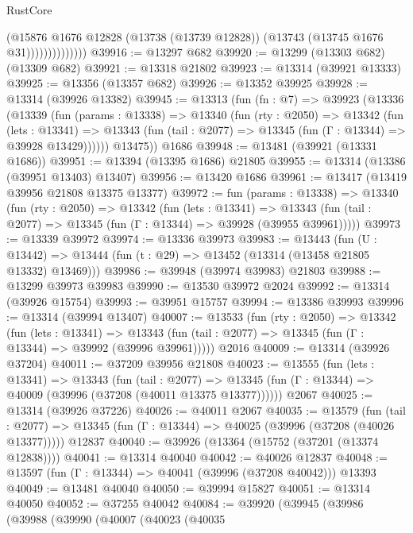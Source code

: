 \begin{lexlean}{RustCore}
\begin{coremodule}
                          (@15876
                            @1676
                            @12828
                            (@13738 (@13739 @12828))
                            (@13743 (@13745 @1676 @31))))))))))))))
@39916 := @13297 @682
@39920 := @13299 (@13303 @682) (@13309 @682)
@39921 := @13318 @21802
@39923 := @13314 (@39921 @13333)
@39925 := @13356 (@13357 @682)
@39926 := @13352 @39925
@39928 := @13314 (@39926 @13382)
@39945 := @13313
    (fun (fn : @7) =>
    @39923
      (@13336
        (@13339
          (fun (params : @13338) =>
          @13340
            (fun (rty : @2050) =>
            @13342
              (fun (lets : @13341) =>
              @13343 (fun (tail : @2077) => @13345 (fun (Γ : @13344) => @39928 @13429))))))
        @13475))
    @1686
@39948 := @13481 (@39921 (@13331 @1686))
@39951 := @13394 (@13395 @1686) @21805
@39955 := @13314 (@13386 (@39951 @13403) @13407)
@39956 := @13420 @1686
@39961 := @13417 (@13419 @39956 @21808 @13375 @13377)
@39972 := fun (params : @13338) =>
  @13340
    (fun (rty : @2050) =>
    @13342
      (fun (lets : @13341) =>
      @13343 (fun (tail : @2077) => @13345 (fun (Γ : @13344) => @39928 (@39955 @39961)))))
@39973 := @13339 @39972
@39974 := @13336 @39973
@39983 := @13443
    (fun (U : @13442) => @13444 (fun (t : @29) => @13452 (@13314 (@13458 @21805 @13332) @13469)))
@39986 := @39948 (@39974 @39983) @21803
@39988 := @13299 @39973 @39983
@39990 := @13530 @39972 @2024
@39992 := @13314 (@39926 @15754)
@39993 := @39951 @15757
@39994 := @13386 @39993
@39996 := @13314 (@39994 @13407)
@40007 := @13533
    (fun (rty : @2050) =>
    @13342
      (fun (lets : @13341) =>
      @13343 (fun (tail : @2077) => @13345 (fun (Γ : @13344) => @39992 (@39996 @39961)))))
    @2016
@40009 := @13314 (@39926 @37204)
@40011 := @37209 @39956 @21808
@40023 := @13555
    (fun (lets : @13341) =>
    @13343
      (fun (tail : @2077) =>
      @13345 (fun (Γ : @13344) => @40009 (@39996 (@37208 (@40011 @13375 @13377))))))
    @2067
@40025 := @13314 (@39926 @37226)
@40026 := @40011 @2067
@40035 := @13579
    (fun (tail : @2077) => @13345 (fun (Γ : @13344) => @40025 (@39996 (@37208 (@40026 @13377)))))
    @12837
@40040 := @39926 (@13364 (@15752 (@37201 (@13374 @12838))))
@40041 := @13314 @40040
@40042 := @40026 @12837
@40048 := @13597 (fun (Γ : @13344) => @40041 (@39996 (@37208 @40042))) @13393
@40049 := @13481 @40040
@40050 := @39994 @15827
@40051 := @13314 @40050
@40052 := @37255 @40042
@40084 := @39920
    (@39945
      (@39986
        (@39988
          (@39990
            (@40007
              (@40023
                (@40035

\end{coremodule}
\end{lexlean}
